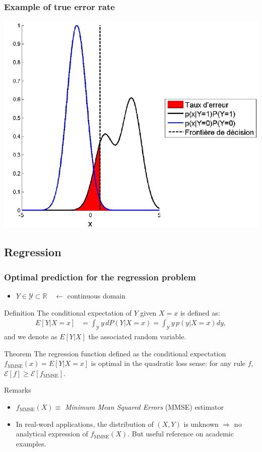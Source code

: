 \documentclass[compress, smaller, serif, 9pt]{beamer}
\begin{document}
\begin{frame}
  \frametitle{Example of true error rate}
  \begin{center}
    \includegraphics[width=.8\textwidth]{ex_taux_erreur.jpg}
  \end{center}
\end{frame}

\subsection{Regression}

\begin{frame}
  \frametitle{Optimal prediction for the regression problem}
  \begin{itemize}
   \item $Y \in \mathcal{Y} \subset \mathbb{R} \quad \leftarrow$ continuous domain
  \end{itemize}

  \begin{block}{Definition}
  The conditional expectation of $Y$ given $X=x$ is defined as:
   \begin{align*}
    E[Y | X=x]&= \int_{\mathcal{Y}} y \,dP( Y | X = x) = \int_{\mathcal{Y}} y\, p( y | X = x) dy,
   \end{align*}
   and we denote as $E[Y | X]$ the associated random variable.
  \end{block}
 \begin{block}{Theorem}
  The regression function defined as the conditional expectation
   $f_{\textrm{MMSE}}(x) = E[Y | X=x]$
  is optimal in the quadratic loss sense:
   for any rule $f$, $\mathcal{E}[f] \ge \mathcal{E}[f_{\textrm{MMSE}}]$.
 \end{block}
 {\scriptsize
  \begin{block}{Remarks}
   \begin{itemize}
    \item $f_{\textrm{MMSE}}(X) \equiv$ {\it Minimum Mean Squared Errors} (MMSE) estimator
    \item In real-word applications,  the distribution of $(X,Y)$ is unknown $\Rightarrow$ no analytical expression  of $f_{\textrm{MMSE}}(X)$. 
    But useful reference on academic examples.
   \end{itemize}
 \end{block}
 }
\end{frame}
\end{document}
